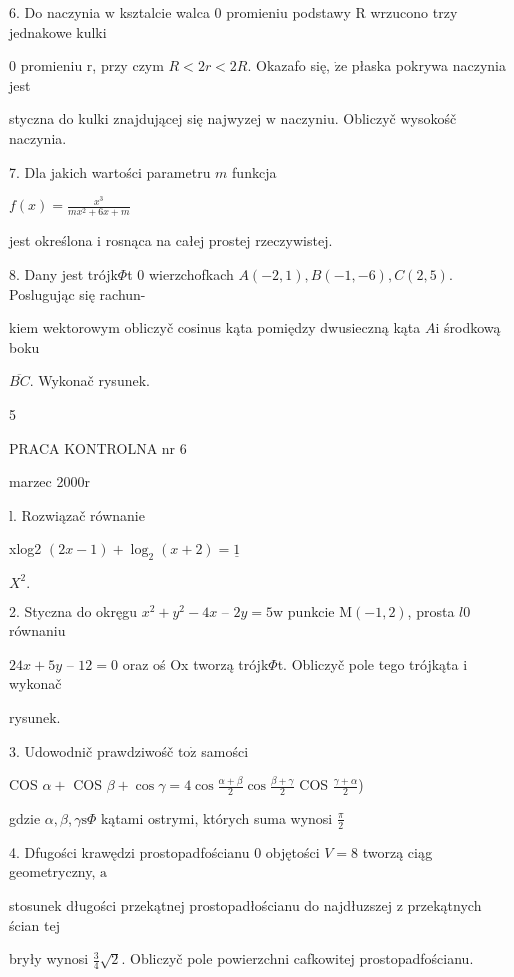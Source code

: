 \documentclass[a4paper,12pt]{article}
\begin{document}
6. Do naczynia $\mathrm{w}$ ksztalcie walca $0$ promieniu podstawy $\mathrm{R}$ wrzucono trzy jednakowe kulki

$0$ promieniu $\mathrm{r}$, przy czym $R< 2r < 2R$. Okazafo się, $\dot{\mathrm{z}}\mathrm{e}$ płaska pokrywa naczynia jest

styczna do kulki znajdującej się najwyzej $\mathrm{w}$ naczyniu. Obliczyč wysokośč naczynia.

7. Dla jakich wartości parametru $m$ funkcja

$f(x)=\displaystyle \frac{x^{3}}{mx^{2}+6x+m}$

jest określona $\mathrm{i}$ rosnąca na całej prostej rzeczywistej.

8. Dany jest trójk$\Phi$t $0$ wierzchofkach $A(-2,1), B(-1,-6), C(2,5)$. Poslugując się rachun-

kiem wektorowym obliczyč cosinus kąta pomiędzy dwusieczną kąta $A\mathrm{i}$ środkową boku

$\overline{BC}$. Wykonač rysunek.

5





PRACA KONTROLNA nr 6

marzec 2000r

l. Rozwiązač równanie

xlog2 $(2x-1)+\log_{2}(x+2) =\underline{1}$

$X^{2}.$

2. Styczna do okręgu $x^{2}+y^{2}-4x$ -- $2y = 5\mathrm{w}$ punkcie $\mathrm{M}(-1,2)$, prosta $l0$ równaniu

$24x+5y$ -- $12 =0$ oraz oś Ox tworzą trójk$\Phi$t. Obliczyč pole tego trójkąta $\mathrm{i}$ wykonač

rysunek.

3. Udowodnič prawdziwośč $\mathrm{t}\mathrm{o}\dot{\mathrm{z}}$ samości

COS $\alpha+$ COS $\displaystyle \beta+\cos\gamma=4\cos\frac{\alpha+\beta}{2}\cos\frac{\beta+\gamma}{2}$ COS $\displaystyle \frac{\gamma+\alpha}{2}$)

gdzie $\alpha, \beta, \gamma \mathrm{s}\Phi$ kątami ostrymi, których suma wynosi $\displaystyle \frac{\pi}{2}$

4. Dfugości krawędzi prostopadfościanu $0$ objętości $V = 8$ tworzą ciąg geometryczny, $\mathrm{a}$

stosunek długości przekątnej prostopadłościanu do najdłuzszej $\mathrm{z}$ przekątnych ścian tej

bryły wynosi $\displaystyle \frac{3}{4}\sqrt{2}$. Obliczyč pole powierzchni cafkowitej prostopadfościanu.
\end{document}
